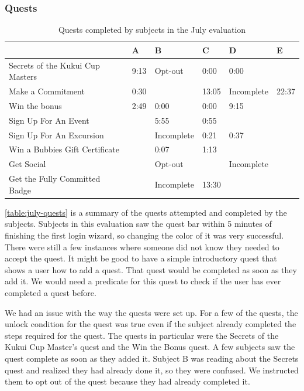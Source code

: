 \subsubsection{Quests}

\begin{table}[t]
	\begin{tabular}{| l || l | l | l | l | l |}
		\hline
		& A & B & C & D & E \\
		\hline
		Secrets of the Kukui Cup Masters & 9:13 & Opt-out & 0:00 & 0:00 & \\
    Make a Commitment & 0:30 & & 13:05 & Incomplete & 22:37 \\
    Win the \textdollar10 bonus & 2:49 & 0:00 & 0:00 & 9:15 & \\
    Sign Up For An Event & & 5:55 & 0:55 & & \\
    Sign Up For An Excursion & & Incomplete & 0:21 & 0:37 & \\
    Win a Bubbies Gift Certificate & & 0:07 & 1:13 & & \\
    Get Social & & Opt-out & & Incomplete & \\
    Get the Fully Committed Badge & & Incomplete & 13:30 & & \\
		\hline
	\end{tabular}
	\caption{Quests completed by subjects in the July evaluation}
	\label{table:july-quests}
\end{table}

\autoref{table:july-quests} is a summary of the quests attempted and completed by the subjects. Subjects in this evaluation saw the quest bar within 5 minutes of finishing the first login wizard, so changing the color of it was very successful. There were still a few instances where someone did not know they needed to accept the quest. It might be good to have a simple introductory quest that shows a user how to  add a quest. That quest would be completed as soon as they add it. We would need a predicate for this quest to check if the user has ever completed a quest before.

We had an issue with the way the quests were set up. For a few of the quests, the unlock condition for the quest was true even if the subject already completed the steps required for the quest. The quests in particular were the Secrets of the Kukui Cup Master's quest and the Win the  Bonus quest. A few subjects saw the quest complete as soon as they added it. Subject B was reading about the Secrets quest and realized they had already done it, so they were confused. We instructed them to opt out of the quest because they had already completed it.

